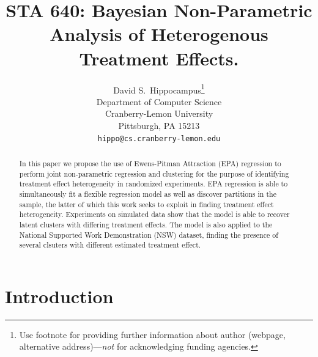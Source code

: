 \documentclass{article}
\title{STA 640: Bayesian Non-Parametric Analysis of Heterogenous Treatment Effects.}
\author{%
  David S.~Hippocampus\thanks{Use footnote for providing further information
    about author (webpage, alternative address)---\emph{not} for acknowledging
    funding agencies.} \\
  Department of Computer Science\\
  Cranberry-Lemon University\\
  Pittsburgh, PA 15213 \\
  \texttt{hippo@cs.cranberry-lemon.edu} \\
}
\begin{document}
\maketitle

\begin{abstract}
  In this paper we propose the use of Ewens-Pitman Attraction (EPA) regression to perform joint non-parametric regression and clustering for the purpose of identifying treatment effect heterogeneity in randomized experiments. EPA regression is able to simultaneously fit a flexible regression model as well as discover partitions in the sample, the latter of which this work seeks to exploit in finding treatment effect heterogeneity. Experiments on simulated data show that the model is able to recover latent clusters with differing treatment effects. The model is also applied to the National Supported Work Demonstration (NSW) dataset, finding the presence of several clsuters with different estimated treatment effect.
\end{abstract}

\section{Introduction}
\end{document}
